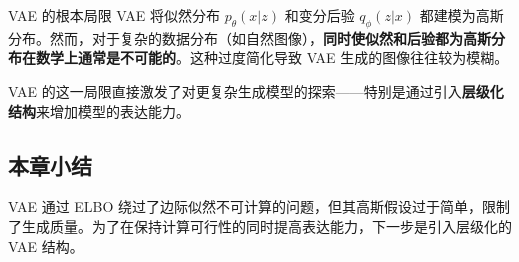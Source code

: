 \begin{warningbox}{VAE 的根本局限}
VAE 将似然分布 $p_\theta(x|z)$ 和变分后验 $q_\phi(z|x)$ 都建模为高斯分布。然而，对于复杂的数据分布（如自然图像），\textbf{同时使似然和后验都为高斯分布在数学上通常是不可能的}。这种过度简化导致 VAE 生成的图像往往较为模糊。
\end{warningbox}

VAE 的这一局限直接激发了对更复杂生成模型的探索——特别是通过引入\textbf{层级化结构}来增加模型的表达能力。

\subsection{本章小结}

VAE 通过 ELBO 绕过了边际似然不可计算的问题，但其高斯假设过于简单，限制了生成质量。为了在保持计算可行性的同时提高表达能力，下一步是引入层级化的 VAE 结构。


